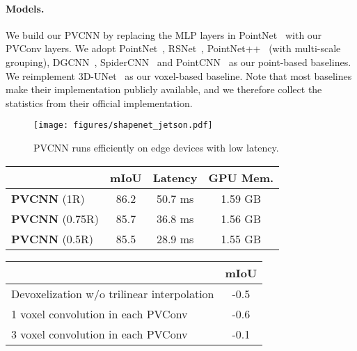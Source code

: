 \documentclass{article}
\newcommand{\myparagraph}[1]{\vspace{-6pt}\paragraph{#1}}
\def\modelshort{PVCNN\xspace}
\def\convshort{PVConv\xspace}
\begin{document}
\myparagraph{Models.}

We build our \modelshort by replacing the MLP layers in PointNet~\cite{Qi:2017vq} with our \convshort layers. We adopt PointNet~\cite{Qi:2017vq}, RSNet~\cite{Huang:2018rs}, PointNet++~\cite{Qi:2017tf} (with multi-scale grouping), DGCNN~\cite{Wang:2018dg}, SpiderCNN~\cite{Xu:2018sp} and PointCNN~\cite{Li:2018tp} as our point-based baselines. We reimplement 3D-UNet~\cite{Cicek:2016un} as our voxel-based baseline. Note that most baselines make their implementation publicly available, and we therefore collect the statistics from their official implementation.



\begin{figure}[!t]
    \centering
    \texttt{[image: figures/shapenet\_jetson.pdf]}
    \caption{\modelshort runs efficiently on edge devices with low latency.}
    \label{fig:shapenet_jetson}
\vspace{-5pt}
\end{figure} \begin{table*}[!t]
\begin{minipage}[b]{0.5\linewidth}
\small\centering
\setlength{\tabcolsep}{4pt}
\begin{tabular}{lccc}
    \toprule
    & mIoU & Latency & GPU Mem.\\
    \midrule
    \textbf{\modelshort} (1R) & 86.2 & 50.7 ms & 1.59 GB \\
    \midrule
    \textbf{\modelshort} (0.75R) & 85.7 & 36.8 ms & 1.56 GB \\
    \textbf{\modelshort} (0.5R) & 85.5 & 28.9 ms & 1.55 GB \\
    \bottomrule
\end{tabular}
\caption{Results of different voxel resolutions.}
\vspace{-5pt}
\label{tab:shapenet_resolutions}
\end{minipage}
\begin{minipage}[b]{0.5\linewidth}
\setlength{\tabcolsep}{3pt}
\small\centering
\begin{tabular}{lc}
    \toprule
    & mIoU \\
    \midrule
Devoxelization w/o trilinear interpolation & -0.5 \\
\midrule
    1 voxel convolution in each \convshort & -0.6 \\
    3 voxel convolution in each \convshort & -0.1 \\
    \bottomrule
\end{tabular}
\caption{Results of more ablation studies.}
\vspace{-5pt}
\label{tab:shapenet_ablation}
\end{minipage}
\end{table*}
\end{document}
